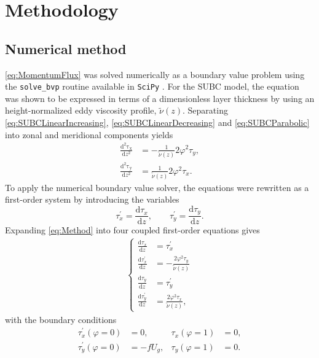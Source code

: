 \section{Methodology}
\subsection{Numerical method}
\autoref{eq:MomentumFlux} was solved numerically as a boundary value problem using the \texttt{solve\_bvp} routine available in \texttt{SciPy} \citep{virtanen2020}. For the SUBC model, the equation was shown to be expressed in terms of a dimensionless layer thickness by using an height-normalized eddy viscosity profile, $\tilde{\nu}(z)$. Separating \autoref{eq:SUBCLinearIncreasing}, \ref{eq:SUBCLinearDecreasing} and \ref{eq:SUBCParabolic} into zonal and meridional components yields
\begin{subequations}
    \label{eq:Method}
    \begin{align}
    \frac{\mathrm{d^2\tau_x}}{\mathrm{d} z^2}
    &=
    -\frac{1}{\tilde\nu(z)}2\varphi^2 \tau_y,
    \\
    \frac{\mathrm{d^2\tau_y}}{\mathrm{d} z^2}
    &=
    \frac{1}{\tilde\nu(z)}2\varphi^2 \tau_x.
\end{align}
\end{subequations}
To apply the numerical boundary value solver, the equations were rewritten as a first-order system by introducing the variables
\begin{equation}
    \tau_x^\prime = \frac{\mathrm{d} \tau_x}{\mathrm{d} z},
    \qquad
    \tau_y^\prime = \frac{\mathrm{d} \tau_y}{\mathrm{d} z}.
\end{equation}
Expanding \autoref{eq:Method} into four coupled first-order equations gives
\begin{align}
    \begin{cases} 
    \frac{\mathrm{d} \tau_x}{\mathrm{d} z}
    &= \tau_x^\prime
    \\
    \frac{\mathrm{d} \tau_x^\prime}{\mathrm{d} z}
    &=
    -\frac{2\varphi^2 \tau_y}{\tilde\nu(z)}
    \\
    \frac{\mathrm{d} \tau_y}{\mathrm{d} z}
    &= \tau_y^\prime
    \\
    \frac{\mathrm{d} \tau_y^\prime}{\mathrm{d} z}
    &=\frac{2\varphi^2 \tau_x}{\tilde\nu(z)},
    \end{cases}
    \label{eq:modelsolver}
\end{align}
with the boundary conditions
\begin{subequations}
    \begin{align}
    \tau_x^\prime(\varphi=0) &= 0,
    &
    \tau_x(\varphi=1) &= 0,
    \\
    \tau_y^\prime(\varphi=0) &= -fU_g,
    &
    \tau_y(\varphi=1) &= 0.
\end{align}
\end{subequations}
